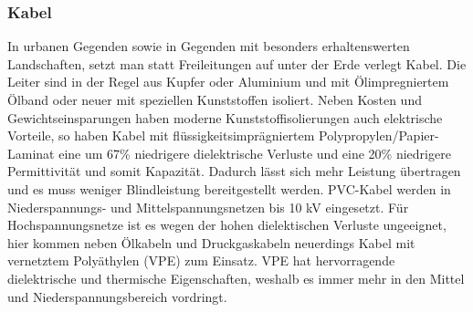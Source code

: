 \documentclass[10pt,a4paper]{article}
\begin{document}
\subsubsection{Kabel}
In urbanen Gegenden sowie in Gegenden mit besonders erhaltenswerten Landschaften, setzt man statt Freileitungen auf unter der Erde verlegt Kabel. Die Leiter sind in der Regel aus Kupfer oder Aluminium und mit Ölimpregniertem Ölband oder neuer mit speziellen Kunststoffen isoliert. %
Neben Kosten und Gewichtseinsparungen haben moderne Kunststoffisolierungen auch elektrische Vorteile, so haben Kabel mit flüssigkeitsimprägniertem Polypropylen/Papier-Laminat eine um 67\% niedrigere dielektrische Verluste und eine 20\% niedrigere Permittivität und somit Kapazität.\cite{Harrison} Dadurch lässt sich mehr Leistung übertragen und es muss weniger Blindleistung bereitgestellt werden.
PVC-Kabel werden in Niederspannungs- und Mittelspannungsnetzen bis 10 kV eingesetzt. Für Hochspannungsnetze ist es wegen der hohen dielektischen Verluste ungeeignet, hier kommen neben Ölkabeln und Druckgaskabeln neuerdings Kabel mit vernetztem Polyäthylen (VPE) zum Einsatz. VPE hat hervorragende dielektrische und thermische Eigenschaften, weshalb es immer mehr in den Mittel und Niederspannungsbereich vordringt.\cite{Flosdorff}
\end{document}
